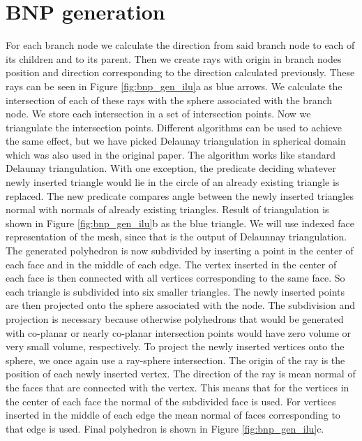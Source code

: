 \section{BNP generation}\label{sec:bnp_gen}
For each branch node we calculate the direction from said branch node to each of its children and to its parent. Then we create rays with origin in branch nodes position and direction corresponding to the direction calculated previously. These rays can be seen in Figure \ref{fig:bnp_gen_ilu}a as blue arrows. We calculate the intersection of each of these rays with the sphere associated with the branch node. We store each intersection in a set of intersection points. Now we triangulate the intersection points. Different algorithms can be used to achieve the same effect, but we have picked Delaunay triangulation in spherical domain which was also used in the original paper. The algorithm works like standard Delaunay triangulation. With one exception, the predicate deciding whatever newly inserted triangle would lie in the circle of an already existing triangle is replaced. The new predicate compares angle between the newly inserted triangles normal with normals of already existing triangles. Result of triangulation is shown in Figure \ref{fig:bnp_gen_ilu}b as the blue triangle. We will use indexed face representation of the mesh, since that is the output of Delaunnay triangulation. The generated polyhedron is now subdivided by inserting a point in the center of each face and in the middle of each edge. The vertex inserted in the center of each face is then connected with all vertices corresponding to the same face. So each triangle is subdivided into six smaller triangles. The newly inserted points are then projected onto the sphere associated with the node. The subdivision and projection is necessary because otherwise polyhedrons that would be generated with co-planar or nearly co-planar intersection points would have zero volume or very small volume, respectively. To project the newly inserted vertices onto the sphere, we once again use a ray-sphere intersection. The origin of the ray is the position of each newly inserted vertex. The direction of the ray is mean normal of the faces that are connected with the vertex. This means that for the vertices in the center of each face the normal of the subdivided face is used. For vertices inserted in the middle of each edge the mean normal of faces corresponding to that edge is used. Final polyhedron is shown in Figure \ref{fig:bnp_gen_ilu}c.

